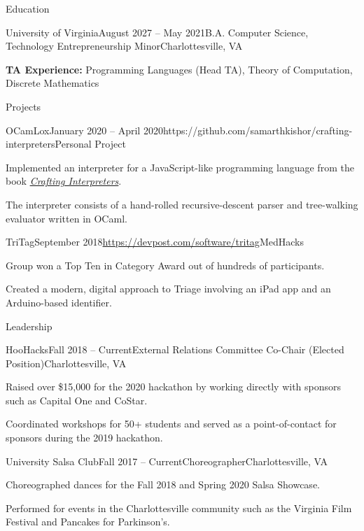 \documentclass{resume}
\begin{document}
\begin{rSection}{Education}

  \begin{rSubsection}{University of Virginia}{August 2027 -- May 2021}{B.A. Computer Science, Technology Entrepreneurship Minor}{Charlottesville, VA}
    \item \textbf{TA Experience:} Programming Languages (Head TA), Theory of Computation, Discrete Mathematics
  \end{rSubsection}

\end{rSection}

\begin{rSection}{Projects}

  \begin{rSubsection}{OCamLox}{January 2020 -- April 2020}{https://github.com/samarthkishor/crafting-interpreters}{Personal Project}
    \item Implemented an interpreter for a JavaScript-like programming language from the book \href{https://craftinginterpreters.com/}{\textit{Crafting Interpreters}}.
    \item The interpreter consists of a hand-rolled recursive-descent parser and tree-walking evaluator written in OCaml.
  \end{rSubsection}

  \begin{rSubsection}{TriTag}{September 2018}{\url{https://devpost.com/software/tritag}}{MedHacks}
    \item Group won a Top Ten in Category Award out of hundreds of participants.
    \item Created a modern, digital approach to Triage involving an iPad app and an Arduino-based identifier.
  \end{rSubsection}

\end{rSection}

\begin{rSection}{Leadership}

  \begin{rSubsection}{HooHacks}{Fall 2018 -- Current}{External Relations Committee Co-Chair (Elected Position)}{Charlottesville, VA}
    \item Raised over \$15,000 for the 2020 hackathon by working directly with sponsors such as Capital One and CoStar.
    \item Coordinated workshops for 50+ students and served as a point-of-contact for sponsors during the 2019 hackathon.
  \end{rSubsection}

  \begin{rSubsection}{University Salsa Club}{Fall 2017 -- Current}{Choreographer}{Charlottesville, VA}
    \item Choreographed dances for the Fall 2018 and Spring 2020 Salsa Showcase.
    \item Performed for events in the Charlottesville community such as the Virginia Film Festival and Pancakes for Parkinson's.
  \end{rSubsection}

\end{rSection}
\end{document}
